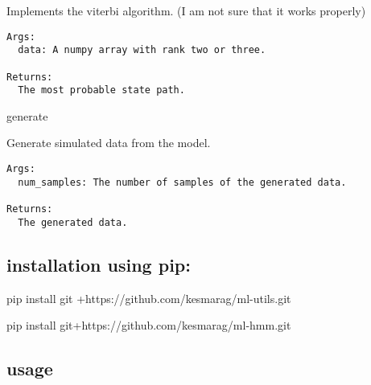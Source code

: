 Implements the viterbi algorithm. (I am not sure that it works properly)

\begin{verbatim}
Args:
  data: A numpy array with rank two or three.

Returns:
  The most probable state path.
\end{verbatim}

generate

\begin{Shaded}
\begin{Highlighting}[]
\end{Highlighting}
\end{Shaded}

Generate simulated data from the model.

\begin{verbatim}
Args:
  num_samples: The number of samples of the generated data.

Returns:
  The generated data.
\end{verbatim}

\hypertarget{installation-using-pip}{%
\subsection{installation using pip:}\label{installation-using-pip}}

pip install git +https://github.com/kesmarag/ml-utils.git

pip install git+https://github.com/kesmarag/ml-hmm.git

\hypertarget{usage}{%
\subsection{usage}\label{usage}}

\begin{Shaded}
\begin{Highlighting}[]

\OperatorTok{=}\NormalTok{, }\NormalTok{, }\NormalTok{)}

\OperatorTok{=}\NormalTok{, }\NormalTok{)}



\end{Highlighting}
\end{Shaded}

